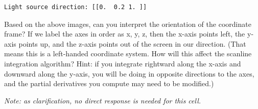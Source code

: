 \documentclass[11pt]{article}
\begin{document}
    \begin{Verbatim}[commandchars=\\\{\}]
Light source direction: [[0.  0.2 1. ]]
    \end{Verbatim}

    Based on the above images, can you interpret the orientation of the
coordinate frame? If we label the axes in order as x, y, z, then the
x-axis points left, the y-axis points up, and the z-axis points out of
the screen in our direction. (That means this is a left-handed
coordinate system. How will this affect the scanline integration
algorithm? Hint: if you integrate rightward along the x-axis and
downward along the y-axis, you will be doing in opposite directions to
the axes, and the partial derivatives you compute may need to be
modified.)

\emph{Note: as clarification, no direct response is needed for this
cell.}
\end{document}
